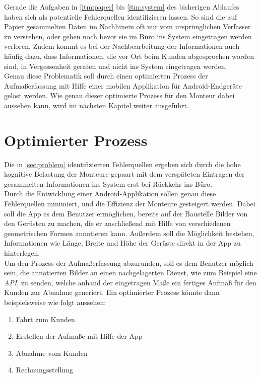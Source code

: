 Gerade die Aufgaben in \autoref{itm:paper} bis \autoref{itm:system} des bisherigen Ablaufes haben sich als potentielle Fehlerquellen identifizieren lassen.
So sind die auf Papier gesammelten Daten im Nachhinein oft nur vom ursprünglichen Verfasser zu verstehen, oder gehen noch bevor sie im Büro ins System eingetragen werden verloren.
Zudem kommt es bei der Nachbearbeitung der Informationen auch häufig dazu, dass Informationen, die vor Ort beim Kunden abgesprochen worden sind, in Vergessenheit geraten und nicht ins System eingetragen werden. \\

Genau diese Problematik soll durch einen optimierten Prozess der Aufmaßerfassung mit Hilfe einer mobilen Applikation für Android-Endgeräte gelöst werden.
Wie genau dieser optimierte Prozess für den Monteur dabei aussehen kann, wird im nächsten Kapitel weiter ausgeführt.

\section{Optimierter Prozess}
Die in \autoref{sec:problem} identifizierten Fehlerquellen ergeben sich durch die hohe kognitive Belastung der Monteure gepaart mit dem verspäteten Eintragen der gesammelten Informationen ins System erst bei Rückkehr ins Büro. \\

Durch die Entwicklung einer Android-Applikation sollen genau diese Fehlerquellen minimiert, und die Effizienz der Monteure gesteigert werden.
Dabei soll die App es dem Benutzer ermöglichen, bereits auf der Baustelle Bilder von den Gerüsten zu machen, die er anschließend mit Hilfe von verschiedenen geometrischen Formen annotieren kann.
Außerdem soll die Möglichkeit bestehen, Informationen wie Länge, Breite und Höhe der Gerüste direkt in der App zu hinterlegen. \\

Um den Prozess der Aufmaßerfassung abzurunden, soll es dem Benutzer möglich sein, die annotierten Bilder an einen nachgelagerten Dienst, wie zum Beispiel eine \emph{API}, zu senden, welche anhand der eingetragen Maße ein fertiges Aufmaß für den Kunden zur Abnahme generiert.
Ein optimierter Prozess könnte dann beispielsweise wie folgt aussehen:
\begin{enumerate}
  \item Fahrt zum Kunden
  \item Erstellen der Aufmaße mit Hilfe der App
  \item Abnahme vom Kunden
  \item Rechnungsstellung
\end{enumerate} 

